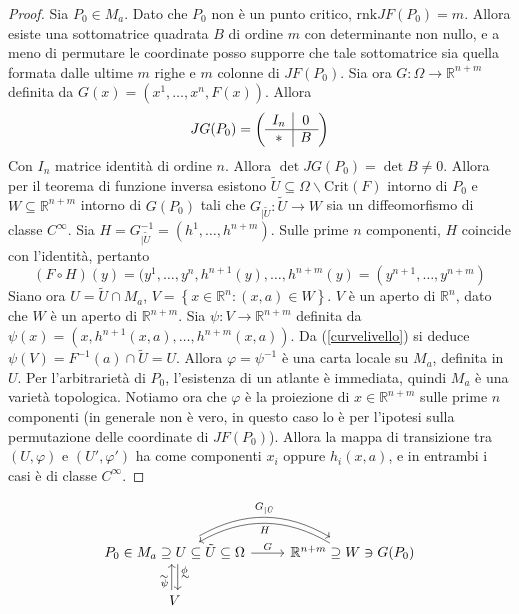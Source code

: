 \documentclass[a4paper,11pt]{article}
\theoremstyle{definition}
\theoremstyle{theorem}
\newcommand{\crit}[1]{\mathrm{Crit}(#1)}
\begin{document}
\begin{proof}
	Sia $P_0\in M_a$. Dato che $P_0$ non è un punto critico, $\mathrm{rnk}JF(P_0)=m$. Allora esiste una sottomatrice quadrata $B$ di ordine $m$ con determinante non nullo, e a meno di permutare le coordinate posso supporre che tale sottomatrice sia quella formata dalle ultime $m$ righe e $m$ colonne di $JF(P_0)$. Sia ora $G\colon\Omega\to\mathbb{R}^{n+m}$ definita da $G(x)=(x^1,\dots,x^n,F(x))$. Allora
\[JG(P_0)=\left(\begin{array}{c | c}
I_n & 0 \\
\hline
* & B
\end{array}\right)\]
Con $I_n$ matrice identità di ordine $n$. Allora $\det JG(P_0)=\det B\neq0$. Allora per il teorema di funzione inversa esistono $\tilde  U\subseteq \Omega\backslash\crit{F}$ intorno di $P_0$ e $W\subseteq\mathbb{R}^{n+m}$ intorno di $G(P_0)$ tali che $G_{|\tilde U}\colon \tilde U\to W$ sia un diffeomorfismo di classe $C^\infty$. Sia $H=G_{|\tilde U}^{-1}=(h^1,\dots,h^{n+m})$. Sulle prime $n$ componenti, $H$ coincide con l'identità, pertanto 
\begin{equation}
\label{curvelivello}
(F\circ H)(y)=(y^1,\dots,y^n,h^{n+1}(y),\dots,h^{n+m}(y)=(y^{n+1},\dots,y^{n+m})\end{equation}
Siano ora $U=\tilde U\cap M_a$, $V=\left\{x\in\mathbb{R}^n:(x,a)\in W\right\}$. $V$ è un aperto di $\mathbb{R}^n$, dato che $W$ è un aperto di $\mathbb{R}^{n+m}$. Sia $\psi\colon V\to\mathbb{R}^{n+m}$ definita da $\psi(x)=(x,h^{n+1}(x,a),\dots,h^{n+m}(x,a))$. Da (\ref{curvelivello}) si deduce $\psi(V)=F^{-1}(a)\cap\tilde{U}=U$. Allora $\varphi=\psi^{-1}$ è una carta locale su $M_a$, definita in $U$. Per l'arbitrarietà di $P_0$, l'esistenza di un atlante è immediata, quindi $M_a$ è una varietà topologica. Notiamo ora che $\varphi$ è la proiezione di $x\in\mathbb{R}^{n+m}$ sulle prime $n$ componenti (in generale non è vero, in questo caso lo è per l'ipotesi sulla permutazione delle coordinate di $JF(P_0)$). Allora la mappa di transizione tra $(U,\varphi)$ e $(U',\varphi')$ ha come componenti $x_i$ oppure $h_i(x,a)$, e in entrambi i casi è di classe  $C^\infty$.
\end{proof}
\[\begin{tikzcd}
P_0\in M_a\supseteq U \arrow[d, "\sim", "\phi" near start, shift left=0.5ex] \subseteq\tilde{U} \arrow[r, bend left, shift left=0.5ex, "G_{|\tilde{U}}"]\subseteq\Omega\arrow[r, "G"]&\mathbb{R}^{n+m}\supseteq W\arrow[l, bend right, shift left=0.5ex, "H"]\ni G(P_0) \\
 V \arrow[u, "\sim", "\psi" near start, shift left=0.5ex]
\end{tikzcd}\]
 
\end{document}
